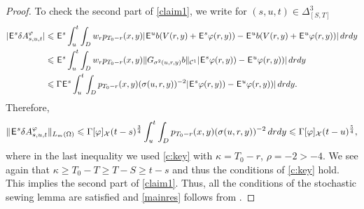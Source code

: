 \documentclass[12pt]{article}
\theoremstyle{definition}
\DeclareMathOperator{\1}{\mathbbm{1}}%
\def\E{\hskip.15ex\mathsf{E}\hskip.10ex}
\def\phi{\varphi}
\renewcommand{\ge}{\geqslant}
\renewcommand{\le}{\leqslant}
\newcommand{\C}{\mathcal{C}}
\newcommand{\X}{\mathcal{X}}
\begin{document}
\begin{proof}
To check the second part of  \eqref{claim1}, we write for $(s,u,t)\in\Delta^3_{[S,T]}$
\begin{align*}
|\E^s\delta A^\phi_{s,u,t}|&\le\E^s  \int_u^t \int_D w_rp_{T_0-r}(x,y) |\E^u b(V(r,y)+\E^s \phi(r,y))-\E^u b(V(r,y)+\E^u \phi(r,y))|\,drdy\\&
\le 
\E^s  \int_u^t \int_D w_rp_{T_0-r}(x,y)  \|G_{\sigma^2(u,r,y)} b\|_{\C^1}|\E^s \phi(r,y))-\E^u \phi(r,y))|\,drdy\\
&\le \Gamma
\E^s  \int_u^t \int_D p_{T_0-r}(x,y)  (\sigma(u,r,y))^{-2}|\E^s \phi(r,y))-\E^u \phi(r,y))|\,drdy. 
\end{align*}
Therefore, 
\begin{equation*}
\|\E^s\delta A^\phi_{s,u,t}\|_{L_m(\Omega)}\le \Gamma[\phi]_{\X}(t-s)^{\frac34}
\int_u^t \int_D p_{T_0-r}(x,y)  (\sigma(u,r,y))^{-2}\,drdy\le \Gamma [\phi]_{\X}(t-u)^{\frac54}, 
\end{equation*}
where in the last inequality we used \cref{c:key} with $\kappa=T_0-r$, $\rho=-2>-4$. We see again  that $\kappa\ge  T_0-T\ge T-S\ge t-s$ and thus the conditions of \cref{c:key} hold. This implies the second part of \eqref{claim1}. 
Thus, all the conditions of the stochastic sewing lemma are satisfied and \eqref{mainres} follows from  \cite[Theorem~2.1]{LeSSL}. 



\end{proof}
\end{document}

